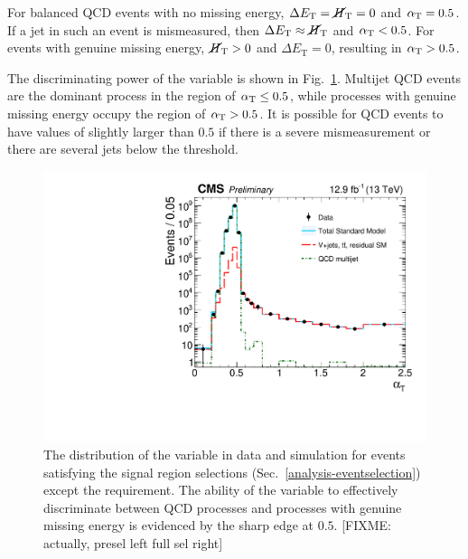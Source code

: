 For balanced QCD events with no missing energy, $\Delta E_\mathrm T = \mbox{$\cancel{H}_\text{T}$} = 0$ 
and $\alpha_{\text{T}} = 0.5$. If a jet in such an event is mismeasured, then $\Delta 
E_\mathrm T \approx \mbox{$\cancel{H}_\text{T}$}$ and $\alpha_{\text{T}} < 0.5$. For events with genuine missing 
energy, $\mbox{$\cancel{H}_\text{T}$} > 0$ and $\Delta E_\mathrm T = 0$, resulting in $\alpha_{\text{T}} > 0.5$.

The discriminating power of the \alphat variable is shown in 
Fig.~\ref{fig:alphat}. Multijet QCD events are the dominant process in the 
region of $\alpha_{\text{T}} \leq 0.5$, while processes with genuine missing energy 
occupy the region of $\alpha_{\text{T}} > 0.5$. It is possible for QCD events to have 
values of \alphat slightly larger than $0.5$ if there is a severe 
mismeasurement or there are several jets below the \pt threshold.




\begin{figure}
\begin{center}
\includegraphics[width=0.7\linewidth]{figs/analysis/propaganda_alphat}
\caption{The distribution of the \alphat variable in data and simulation for 
events satisfying the signal region selections 
(Sec.~\ref{analysis-eventselection}) except the \alphat requirement. The 
ability of the variable to effectively discriminate between QCD processes and 
processes with genuine missing energy is evidenced by the sharp edge at $0.5$. 
[FIXME: actually, presel left full sel right]}
\label{fig:alphat}
\end{center}
\end{figure}

